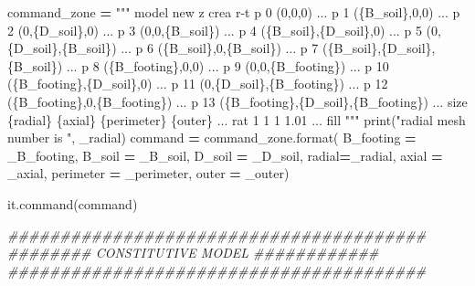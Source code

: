 \documentclass[a4paper, nobind]{templates/ociamthesis}
\newenvironment{Shaded}{\begin{snugshade}}{\end{snugshade}}
\newcommand{\BuiltInTok}[1]{#1}
\newcommand{\CommentTok}[1]{\textcolor[rgb]{0.56,0.35,0.01}{\textit{#1}}}
\newcommand{\NormalTok}[1]{#1}
\newcommand{\OperatorTok}[1]{\textcolor[rgb]{0.81,0.36,0.00}{\textbf{#1}}}
\newcommand{\SpecialCharTok}[1]{\textcolor[rgb]{0.00,0.00,0.00}{#1}}
\newcommand{\StringTok}[1]{\textcolor[rgb]{0.31,0.60,0.02}{#1}}
\renewenvironment{Shaded}
{
  \vspace{10pt}%
  \begin{snugshade}%
}{%
  \end{snugshade}%
  \vspace{8pt}%
}
\begin{document}
\begin{Shaded}
\begin{Highlighting}[]
\NormalTok{command\_zone }\OperatorTok{=} \StringTok{"""}
\StringTok{model new}
\StringTok{z crea r{-}t p 0 (0,0,0) ...}
\StringTok{           p 1 (}\SpecialCharTok{\{B\_soil\}}\StringTok{,0,0) ...}
\StringTok{           p 2 (0,}\SpecialCharTok{\{D\_soil\}}\StringTok{,0) ...}
\StringTok{           p 3 (0,0,}\SpecialCharTok{\{B\_soil\}}\StringTok{) ...}
\StringTok{           p 4 (}\SpecialCharTok{\{B\_soil\}}\StringTok{,}\SpecialCharTok{\{D\_soil\}}\StringTok{,0) ...}
\StringTok{           p 5 (0,}\SpecialCharTok{\{D\_soil\}}\StringTok{,}\SpecialCharTok{\{B\_soil\}}\StringTok{) ...}
\StringTok{           p 6 (}\SpecialCharTok{\{B\_soil\}}\StringTok{,0,}\SpecialCharTok{\{B\_soil\}}\StringTok{) ...}
\StringTok{           p 7 (}\SpecialCharTok{\{B\_soil\}}\StringTok{,}\SpecialCharTok{\{D\_soil\}}\StringTok{,}\SpecialCharTok{\{B\_soil\}}\StringTok{) ...}
\StringTok{           p 8 (}\SpecialCharTok{\{B\_footing\}}\StringTok{,0,0) ...}
\StringTok{           p 9 (0,0,}\SpecialCharTok{\{B\_footing\}}\StringTok{) ...}
\StringTok{           p 10 (}\SpecialCharTok{\{B\_footing\}}\StringTok{,}\SpecialCharTok{\{D\_soil\}}\StringTok{,0) ...}
\StringTok{           p 11 (0,}\SpecialCharTok{\{D\_soil\}}\StringTok{,}\SpecialCharTok{\{B\_footing\}}\StringTok{) ...}
\StringTok{           p 12 (}\SpecialCharTok{\{B\_footing\}}\StringTok{,0,}\SpecialCharTok{\{B\_footing\}}\StringTok{) ...}
\StringTok{           p 13 (}\SpecialCharTok{\{B\_footing\}}\StringTok{,}\SpecialCharTok{\{D\_soil\}}\StringTok{,}\SpecialCharTok{\{B\_footing\}}\StringTok{) ...}
\StringTok{           size }\SpecialCharTok{\{radial\}}\StringTok{ }\SpecialCharTok{\{axial\}}\StringTok{ }\SpecialCharTok{\{perimeter\}}\StringTok{ }\SpecialCharTok{\{outer\}}\StringTok{ ...}
\StringTok{           rat 1 1 1 1.01 ...}
\StringTok{           fill}
\StringTok{"""}
\BuiltInTok{print}\NormalTok{(}\StringTok{"radial mesh number is "}\NormalTok{, \_radial)}
\NormalTok{command }\OperatorTok{=}\NormalTok{ command\_zone.}\BuiltInTok{format}\NormalTok{(}
\NormalTok{B\_footing }\OperatorTok{=}\NormalTok{ \_B\_footing,}
\NormalTok{B\_soil }\OperatorTok{=}\NormalTok{ \_B\_soil,}
\NormalTok{D\_soil }\OperatorTok{=}\NormalTok{ \_D\_soil,}
\NormalTok{radial}\OperatorTok{=}\NormalTok{\_radial,}
\NormalTok{axial }\OperatorTok{=}\NormalTok{ \_axial,}
\NormalTok{perimeter }\OperatorTok{=}\NormalTok{ \_perimeter,}
\NormalTok{outer }\OperatorTok{=}\NormalTok{ \_outer)}

\NormalTok{it.command(command)}


\CommentTok{\#\#\#\#\#\#\#\#\#\#\#\#\#\#\#\#\#\#\#\#\#\#\#\#\#\#\#\#\#\#\#\#\#\#\#\#\#\#\#\#}
\CommentTok{\#\#\#\#\#\#\#\# CONSTITUTIVE MODEL \#\#\#\#\#\#\#\#\#\#\#\#}
\CommentTok{\#\#\#\#\#\#\#\#\#\#\#\#\#\#\#\#\#\#\#\#\#\#\#\#\#\#\#\#\#\#\#\#\#\#\#\#\#\#\#\#}


\end{Highlighting}
\end{Shaded}
\end{document}
